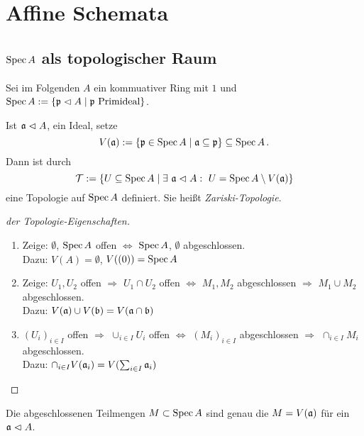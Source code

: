 \section{Affine Schemata}

\subsection{$\operatorname{Spec} A$ als topologischer Raum}

Sei im Folgenden $A$ ein kommuativer Ring mit $1$ und 
$\operatorname{Spec} A := \{\mathfrak{p} \vartriangleleft A \mid \mathfrak{p} \text{ Primideal}\}$.

\begin{definition}
	Ist $\mathfrak{a} \vartriangleleft A$, ein Ideal, setze
	\[
		V(\mathfrak{a}) := \{\mathfrak{p} \in \operatorname{Spec} A \mid \mathfrak{a} \subseteq \mathfrak{p} \} \subseteq \operatorname{Spec} A\,.
	\]
	Dann ist durch
	\[
		\mathcal T := \{ U \subseteq \operatorname{Spec} A \mid
			\exists\ \mathfrak{a} \vartriangleleft A:\ U = \operatorname{Spec} A \setminus V(\mathfrak{a})\}
	\]
	eine Topologie auf $\operatorname{Spec} A$ definiert. Sie heißt \emph{Zariski-Topologie}.
\end{definition}

\begin{proof}[der Topologie-Eigenschaften]
	\begin{enumerate}
	  \item Zeige: $\emptyset$, $\operatorname{Spec} A$ offen $\Longleftrightarrow$ 
	  	$\operatorname{Spec} A$, $\emptyset$ abgeschlossen.\\
	  	Dazu: $V(A) = \emptyset$, $V((0)) = \operatorname{Spec} A$
	  \item Zeige: $U_1, U_2$ offen $\Rightarrow$ $U_1 \cap U_2$ offen
	  	$\Longleftrightarrow$ $M_1,M_2$ abgeschlossen $\Rightarrow$
	  	$M_1 \cup M_2$ abgeschlossen.\\
	  	Dazu:
	  	$V(\mathfrak{a}) \cup V(\mathfrak b) = V(\mathfrak{a} \cap \mathfrak b)$
	  \item $(U_i)_{i\in I}$ offen $\Rightarrow$ $\cup_{i\in I} U_i$ offen
	  	$\Longleftrightarrow$ $(M_i)_{i\in I}$ abgeschlossen
	  	$\Rightarrow$ $\cap_{i\in I} M_i$ abgeschlossen.\\
	  	Dazu:
	  	$\cap_{i\in I} V(\mathfrak{a}_i) = V(\sum_{i\in I} \mathfrak{a}_i)$
	\end{enumerate}
\end{proof}

\begin{bemerkung}
	Die abgeschlossenen Teilmengen $M \subset \operatorname{Spec} A$ sind genau die 
	$M = V(\mathfrak{a})$ für ein $\mathfrak{a} \vartriangleleft A$.
\end{bemerkung}

